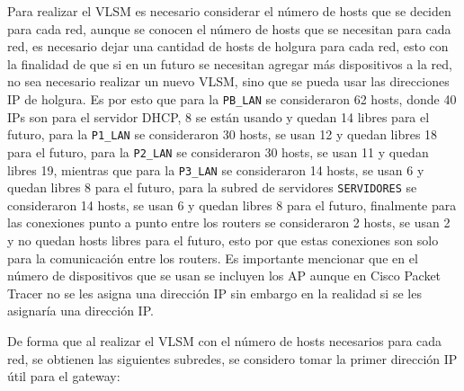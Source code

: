 \documentclass[letterpaper,11pt]{article}
\begin{document}
    Para realizar el VLSM es necesario considerar el número de hosts que se deciden para cada red, aunque se conocen el número de hosts que se necesitan para cada red, es necesario dejar una cantidad de hosts de holgura para cada red, esto con la finalidad de que si en un futuro se necesitan agregar más dispositivos a la red, no sea necesario realizar un nuevo VLSM, sino que se pueda usar las direcciones IP de holgura. Es por esto que para la \texttt{PB\_LAN} se consideraron 62 hosts, donde 40 IPs son para el servidor DHCP, 8 se están usando y quedan 14 libres para el futuro, para la \texttt{P1\_LAN} se consideraron 30 hosts, se usan 12 y quedan libres 18 para el futuro, para la \texttt{P2\_LAN} se consideraron 30 hosts, se usan 11 y quedan libres 19, mientras que para la \texttt{P3\_LAN} se consideraron 14 hosts, se usan 6 y quedan libres 8 para el futuro, para la subred de servidores \texttt{SERVIDORES} se consideraron 14 hosts, se usan 6 y quedan libres 8 para el futuro, finalmente para las conexiones punto a punto entre los routers se consideraron 2 hosts, se usan 2 y no quedan hosts libres para el futuro, esto por que estas conexiones son solo para la comunicación entre los routers. Es importante mencionar que en el número de dispositivos que se usan se incluyen los AP aunque en Cisco Packet Tracer no se les asigna una dirección IP sin embargo en la realidad si se les asignaría una dirección IP.

    De forma que al realizar el VLSM con el número de hosts necesarios para cada red, se obtienen las siguientes subredes, se considero tomar la primer dirección IP útil para el gateway:
\end{document}
